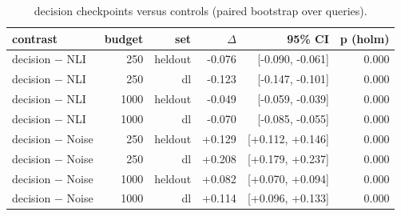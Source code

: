 \begin{table}[t]
\centering
\caption{decision checkpoints versus controls (paired bootstrap over queries).}
\begin{tabular}{l r r r r r}
\toprule
contrast & budget & set & $\Delta$ & 95\% CI & p (holm) \\
\midrule
decision − NLI & 250 & heldout & -0.076 & [-0.090, -0.061] & 0.000 \\
decision − NLI & 250 & dl & -0.123 & [-0.147, -0.101] & 0.000 \\
decision − NLI & 1000 & heldout & -0.049 & [-0.059, -0.039] & 0.000 \\
decision − NLI & 1000 & dl & -0.070 & [-0.085, -0.055] & 0.000 \\
decision − Noise & 250 & heldout & +0.129 & [+0.112, +0.146] & 0.000 \\
decision − Noise & 250 & dl & +0.208 & [+0.179, +0.237] & 0.000 \\
decision − Noise & 1000 & heldout & +0.082 & [+0.070, +0.094] & 0.000 \\
decision − Noise & 1000 & dl & +0.114 & [+0.096, +0.133] & 0.000 \\
\bottomrule
\end{tabular}
\end{table}
